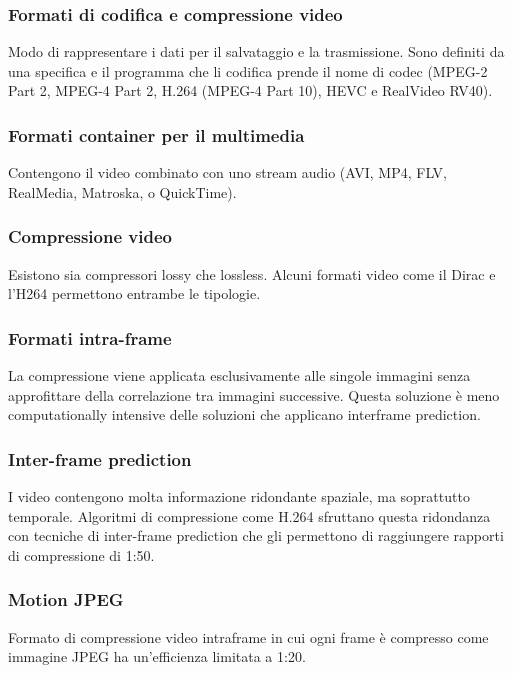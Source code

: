 \documentclass[8pt,a4paper]{article}
\begin{document}
\begin{multicols}{5}
    \subsubsection{Formati di codifica e compressione video}
    Modo di rappresentare i dati per il salvataggio e la trasmissione. Sono 
    definiti da una specifica e il programma che li codifica prende il nome di 
    codec (MPEG-2 Part 2, MPEG-4 Part 2, H.264 (MPEG-4 Part 10), HEVC e RealVideo RV40).

    \subsubsection{Formati container per il multimedia}
    Contengono il video combinato con uno stream audio (AVI, MP4, FLV, RealMedia, 
    Matroska, o QuickTime).

    \subsubsection{Compressione video}
    Esistono sia compressori lossy che lossless. Alcuni formati video come il 
    Dirac e l’H264 permettono entrambe le tipologie.

    \subsubsection{Formati intra-frame}
    La compressione viene applicata esclusivamente alle singole immagini senza 
    approfittare della correlazione tra immagini successive. Questa soluzione è meno 
    computationally intensive delle soluzioni che applicano interframe prediction.

    \subsubsection{Inter-frame prediction}
    I video contengono molta informazione ridondante spaziale, ma soprattutto temporale. 
    Algoritmi di compressione come H.264 sfruttano questa ridondanza con tecniche 
    di inter-frame prediction che gli permettono di raggiungere rapporti di compressione 
    di 1:50.

    \subsubsection{Motion JPEG}
    Formato di compressione video intraframe in cui ogni frame è compresso come 
    immagine JPEG ha un’efficienza limitata a 1:20. 


\end{multicols}
\end{document}
